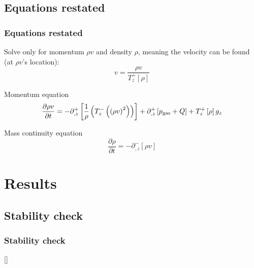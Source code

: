 \documentclass{beamer}
\begin{document}
\subsection{Equations restated}
\begin{frame}
    \frametitle{Equations restated}

    Solve only for momentum $\rho v$ and density $\rho$, meaning the velocity can be found (at $\rho v$'s location):
    \begin{equation}
        v = \frac{\rho v}{T^+_z \left[ \rho \right]}
        \label{eq:vel}
    \end{equation}

    Momentum equation
    \begin{equation}
        \frac{\partial \rho v}{\partial t} = -\partial_{,z}^+ \left[ \frac{1}{\rho} \left( T^{-}_z \left( \left( \rho v \right)^2 \right) \right) \right] + \partial^+_{,z} \left[ p_{\rm gas} + Q \right] + T^+_z \left[ \rho \right] g_z
        \label{eq:staggered_momentum}
    \end{equation}

    Mass continuity equation
    \begin{equation}
        \frac{\partial \rho}{\partial t} = - \partial^-_{,z} \left[ \rho v \right]
        \label{eq:staggered_density}
    \end{equation}

\end{frame}

\section{Results}
\subsection{Stability check}
\begin{frame}
    \frametitle{Stability check}
    \href{http://77.237.250.152/wordpress/studier/stability_web.mp4}[]

    \begin{center}
    \end{center}


\end{frame}
\end{document}
